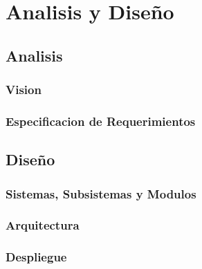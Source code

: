 
\chapter{Analisis y Diseño}
\label{capitulo3}

\section{Analisis}

\subsection{Vision}

\subsection{Especificacion de Requerimientos}

\section{Diseño}

\subsection{Sistemas, Subsistemas y Modulos}

\subsection{Arquitectura}

\subsection{Despliegue}
